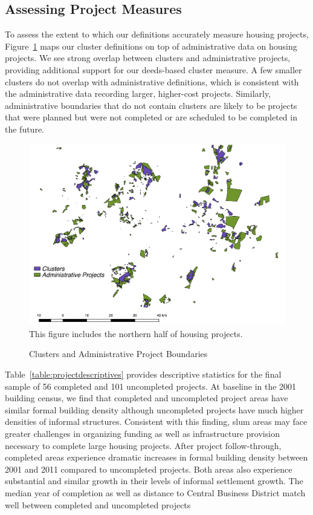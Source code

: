 \documentclass[12pt]{article}
\begin{document}
\subsection{Assessing Project Measures}

To assess the extent to which our definitions accurately measure housing projects, Figure~\ref{figure:gcrooverlap} maps our cluster definitions on top of administrative data on housing projects.  We see strong overlap between clusters and administrative projects, providing additional support for our deeds-based cluster measure.  A few smaller clusters do not overlap with administrative definitions, which is consistent with the administrative data recording larger, higher-cost projects.  Similarly, administrative boundaries that do not contain clusters are likely to be projects that were planned but were not completed or are scheduled to be completed in the future.

\begin{figure}
\caption{Clusters and Administrative Project Boundaries}\label{figure:gcrooverlap}
\centering
\includegraphics[scale=.5]{figures/gcro_convexhull_overlap.pdf} \\
This figure includes the northern half of housing projects.
\end{figure}

Table~\ref{table:projectdescriptives} provides descriptive statistics for the final sample of 56 completed and 101 uncompleted projects.  At baseline in the 2001 building census, we find that completed and uncompleted project areas have similar formal building density although uncompleted projects have much higher densities of informal structures.  Consistent with this finding, slum areas may face greater challenges in organizing funding as well as infrastructure provision necessary to complete large housing projects.  After project follow-through, completed areas experience dramatic increases in formal building density between 2001 and 2011 compared to uncompleted projects.  Both areas also experience substantial and similar growth in their levels of informal settlement growth.  The median year of completion as well as distance to Central Business District match well between completed and uncompleted projects 
\end{document}
